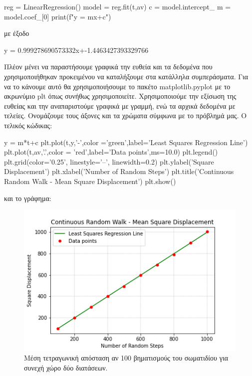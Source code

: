 \en
\begin{python}
reg = LinearRegression()
model = reg.fit(t,av)
c = model.intercept_
m = model.coef_[0]
print(f"y = {m}x+{c}")
\end{python}
\gr 
με έξοδο
\en
\begin{python}
y = 0.999278690573332x+-1.4463427393329766
\end{python}
\gr 
Πλέον μένει να παραστήσουμε γραφικά την ευθεία και τα δεδομένα που χρησιμοποιήθηκαν προκειμένου να καταλήξουμε στα κατάλληλα συμπεράσματα.
Για να το κάνουμε αυτό θα χρησιμοποιήσουμε το πακέτο {\en matplotlib.pyplot} με το ακρωνύμιο {\en plt} όπως συνήθως χρησιμοποιείτε. Χρησιμοποιούμε την εξίσωση της ευθείας και την αναπαριστούμε γραφικά με γραμμή, ενώ τα αρχικά δεδομένα με τελείες. Ονομάζουμε τους άξονες και τα χρώματα σύμφωνα με το πρόβλημά μας. Ο τελικός κώδικας: 
\en
\begin{python}
y = m*t+c
plt.plot(t,y,'-',color ='green',label='Least Squares Regression Line')
plt.plot(t,av,'.',color = 'red',label='Data points',ms=10.0)
plt.legend()
plt.grid(color='0.25', linestyle='--', linewidth=0.2)
plt.ylabel('Square Displacement')
plt.xlabel('Number of Random Steps')
plt.title('Continuous Random Walk - Mean Square Displacement')
plt.show()
\end{python}
\gr και το {\en } γράφημα:
\begin{figure}[H]
\begin{center}
\includegraphics[scale=1]{figures/CRW_MSD.png}
\caption{Μέση τετραγωνική απόσταση αν 100 βηματισμούς του σωματιδίου για συνεχή χώρο δύο διατάσεων.}
\label{figuridion3d}
\end{center}
\end{figure}
